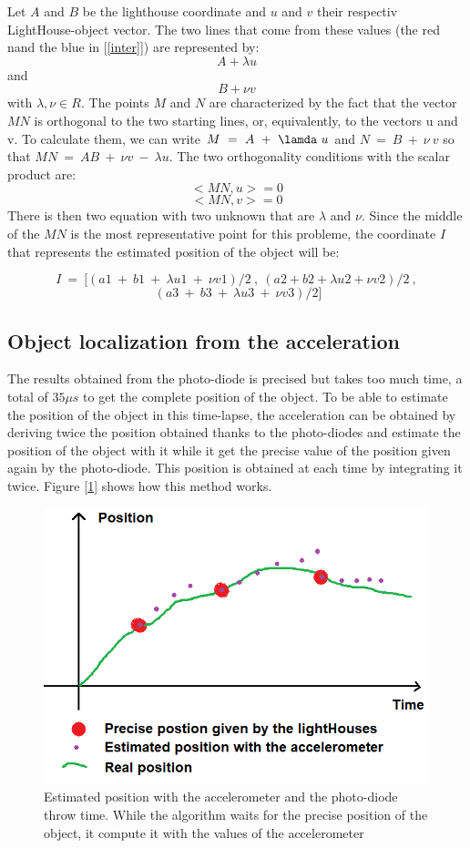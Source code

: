 \documentclass{vldb}
\begin{document}
Let $A$ and $B$ be the lighthouse coordinate and $u$ and $v$ their respectiv LightHouse-object vector. The two lines that come from these values (the red nand the blue in [\ref{inter}]) are represented by:
$$ A  + \lambda u $$ and $$B + \nu v$$ with $\lambda,\nu \in R$. 
The points $M$ and $N$ are characterized by the fact that the vector $MN$ is orthogonal to the two starting lines, or, equivalently, to the vectors u and v. To calculate them, we can write $M~=~A~+~\lamda~u$ and $N~=~ B ~+~ \nu~v$ so that $MN~=~ AB~+~ \nu v~-~\lambda u$. The two orthogonality conditions with the scalar product are:
$$<MN,u> = 0$$
$$<MN,v> = 0
$$
There is then two equation with two unknown that are $\lambda$ and $\nu$. Since the middle of the $MN$ is the most representative point for this probleme, the coordinate $I$ that represents the estimated position of the object will be:

$$
 I ~=~[ (a1 ~+ ~b1~ +~ \lambda u1 ~+~ \nu v1) / 2~ ,~   (a2 + b2 + \lambda u2 + \nu v2) / 2 ~,$$
 $$~ (a3~ +~ b3~ +~ \lambda u3 ~+~ \nu v3) / 2 ]
 $$
 
 \subsection{Object localization from the acceleration}
 The results obtained from the photo-diode is precised but takes too much time, a total of $35 \mu s $ to get the complete position of the object. To be able to estimate the position of the object in this time-lapse, the acceleration can be obtained by deriving twice the position obtained thanks to the photo-diodes and estimate the position of the object with it while it get the precise value of the position given again by the photo-diode. This position is obtained at each time by integrating it twice. Figure [\ref{axel}] shows how this method works.
 \begin{figure}
 \centering
\includegraphics[width=1.0\columnwidth]{Image/axel.png}
\caption{Estimated position with the accelerometer and the photo-diode throw time. While the algorithm waits for the precise position of the object, it compute it with the values of the accelerometer}
\label{axel}
\end{figure}
\end{document}
